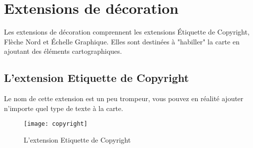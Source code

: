 
\section{Extensions de décoration}


Les extensions de décoration comprennent les extensions Étiquette de Copyright, 
Flèche Nord et Échelle Graphique. Elles sont destinées à "habiller" la carte en
ajoutant des éléments cartographiques.

\subsection{L'extension Etiquette de Copyright}\label{copyrightlabel}

Le nom de cette extension est un peu trompeur, vous pouvez en réalité ajouter
n'importe quel type de texte à la carte.

\begin{figure}[ht]
   \begin{center}   
   \texttt{[image: copyright]}
   \caption{L'extension Etiquette de Copyright \nixcaption}\label{fig:copyright}
\end{center}  
\end{figure}

